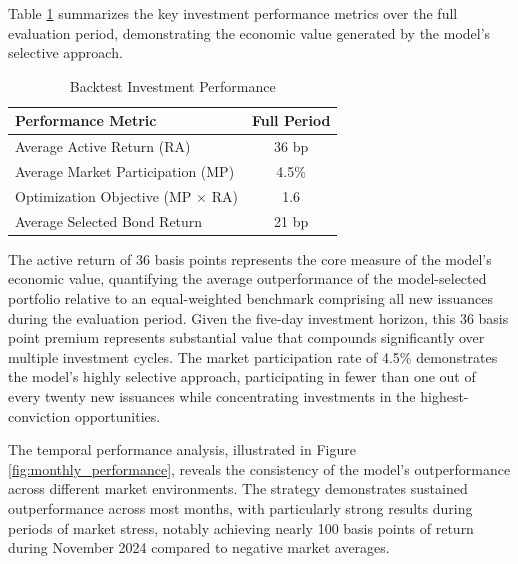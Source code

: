 Table \ref{tab:backtest_performance} summarizes the key investment performance metrics over the full evaluation period, demonstrating the economic value generated by the model's selective approach.

\begin{table}[htbp]
\centering
\caption{Backtest Investment Performance}
\label{tab:backtest_performance}
\begin{tabular}{lc}
\hline
\textbf{Performance Metric} & \textbf{Full Period} \\
\hline
Average Active Return (RA) & 36 bp \\
Average Market Participation (MP) & 4.5\% \\
Optimization Objective (MP $\times$ RA) & 1.6 \\
Average Selected Bond Return & 21 bp \\
\hline
\end{tabular}
\end{table}

The active return of 36 basis points represents the core measure of the model's economic value, quantifying the average outperformance of the model-selected portfolio relative to an equal-weighted benchmark comprising all new issuances during the evaluation period. Given the five-day investment horizon, this 36 basis point premium represents substantial value that compounds significantly over multiple investment cycles. The market participation rate of 4.5\% demonstrates the model's highly selective approach, participating in fewer than one out of every twenty new issuances while concentrating investments in the highest-conviction opportunities.

The temporal performance analysis, illustrated in Figure \ref{fig:monthly_performance}, reveals the consistency of the model's outperformance across different market environments. The strategy demonstrates sustained outperformance across most months, with particularly strong results during periods of market stress, notably achieving nearly 100 basis points of return during November 2024 compared to negative market averages.

